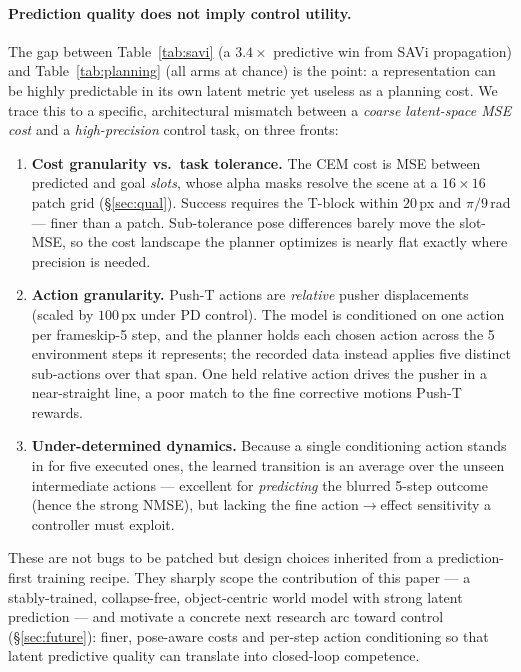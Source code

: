 \documentclass[12pt]{article}
\begin{document}
\paragraph{Prediction quality does not imply control utility.} The gap between Table~\ref{tab:savi} (a $3.4\times$ predictive win from SAVi propagation) and Table~\ref{tab:planning} (all arms at chance) is the point: a representation can be highly predictable in its own latent metric yet useless as a planning cost. We trace this to a specific, architectural mismatch between a \emph{coarse latent-space MSE cost} and a \emph{high-precision} control task, on three fronts:
\begin{enumerate}[leftmargin=*]
    \item \textbf{Cost granularity vs.\ task tolerance.} The CEM cost is MSE between predicted and goal \emph{slots}, whose alpha masks resolve the scene at a $16\times16$ patch grid (\S\ref{sec:qual}). Success requires the T-block within $20$\,px and $\pi/9$\,rad --- finer than a patch. Sub-tolerance pose differences barely move the slot-MSE, so the cost landscape the planner optimizes is nearly flat exactly where precision is needed.
    \item \textbf{Action granularity.} Push-T actions are \emph{relative} pusher displacements (scaled by $100$\,px under PD control). The model is conditioned on one action per frameskip-5 step, and the planner holds each chosen action across the 5 environment steps it represents; the recorded data instead applies five distinct sub-actions over that span. One held relative action drives the pusher in a near-straight line, a poor match to the fine corrective motions Push-T rewards.
    \item \textbf{Under-determined dynamics.} Because a single conditioning action stands in for five executed ones, the learned transition is an average over the unseen intermediate actions --- excellent for \emph{predicting} the blurred 5-step outcome (hence the strong NMSE), but lacking the fine action$\rightarrow$effect sensitivity a controller must exploit.
\end{enumerate}
These are not bugs to be patched but design choices inherited from a prediction-first training recipe. They sharply scope the contribution of this paper --- a stably-trained, collapse-free, object-centric world model with strong latent prediction --- and motivate a concrete next research arc toward control (\S\ref{sec:future}): finer, pose-aware costs and per-step action conditioning so that latent predictive quality can translate into closed-loop competence.
\end{document}
